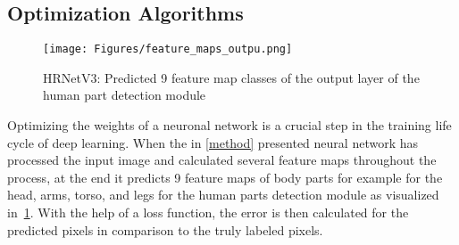 \subsection{Optimization Algorithms}
\label{opt}
\begin{figure}[H]
    \centering
    \texttt{[image: Figures/feature\_maps\_outpu.png]}
    \decoRule
    \caption[HRNetV3: Prediceted Feature Maps]{HRNetV3: Predicted 9 feature map classes of the output layer of the
    human part detection module}
    \label{fig:feature-maps-output}
\end{figure}
Optimizing the weights of a neuronal network is a crucial step in the training life cycle of deep learning.
When the in \autoref{method} presented neural network has processed the input image and calculated several feature
maps throughout the process,
at the end it predicts 9 feature maps of body parts for example for the head, arms, torso, and legs for the human parts
detection module as visualized in~\ref{fig:feature-maps-output}.
With the help of a loss function, the error is then calculated for the predicted pixels in comparison to the truly
labeled
pixels.

